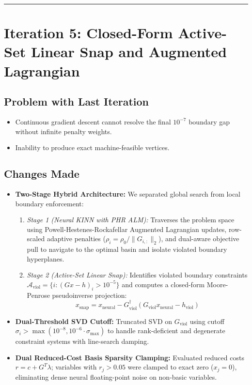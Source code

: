 \documentclass[11pt,a4paper]{article}
\begin{document}
\vspace{1em}
\hrule
\vspace{1.5em}

\section{Iteration 5: Closed-Form Active-Set Linear Snap and Augmented Lagrangian}

\subsection{Problem with Last Iteration}
\begin{itemize}[leftmargin=1.5em, itemsep=2pt]
    \item Continuous gradient descent cannot resolve the final $10^{-7}$ boundary gap without infinite penalty weights.
    \item Inability to produce exact machine-feasible vertices.
\end{itemize}

\subsection{Changes Made}
\begin{itemize}[leftmargin=1.5em, itemsep=2pt]
    \item \textbf{Two-Stage Hybrid Architecture:} We separated global search from local boundary enforcement:
    \begin{enumerate}[leftmargin=1.5em, itemsep=2pt]
        \item \textit{Stage 1 (Neural KINN with PHR ALM):} Traverses the problem space using Powell-Hestenes-Rockafellar Augmented Lagrangian updates, row-scaled adaptive penalties ($\rho_i = \rho_0 / \|G_{i,:}\|_2$), and dual-aware objective pull to navigate to the optimal basin and isolate violated boundary hyperplanes.
        \item \textit{Stage 2 (Active-Set Linear Snap):} Identifies violated boundary constraints $\mathcal{A}_{\text{viol}} = \{i : (G x - h)_i > 10^{-5}\}$ and computes a closed-form Moore-Penrose pseudoinverse projection:
        \begin{equation}
            x_{\text{snap}} = x_{\text{neural}} - G_{\text{viol}}^\dagger (G_{\text{viol}} x_{\text{neural}} - h_{\text{viol}})
        \end{equation}
    \end{enumerate}
    \item \textbf{Dual-Threshold SVD Cutoff:} Truncated SVD on $G_{\text{viol}}$ using cutoff $\sigma_i > \max(10^{-8}, 10^{-6} \cdot \sigma_{\max})$ to handle rank-deficient and degenerate constraint systems with line-search damping.
    \item \textbf{Dual Reduced-Cost Basis Sparsity Clamping:} Evaluated reduced costs $r = c + G^T \lambda$; variables with $r_j > 0.05$ were clamped to exact zero ($x_j = 0$), eliminating dense neural floating-point noise on non-basic variables.
\end{itemize}
\end{document}
